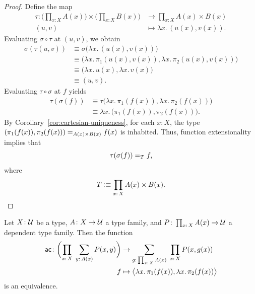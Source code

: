 \begin{proof}
    Define the map
    \begin{align*}
        \tau\colon
            \biggl(
                    \prod_{x\colon X}
                        A(x)\biggr)\times\biggl(\prod_{x\colon X}B(x)
                \biggr)
            &\to\prod_{x\colon X}A(x)\times B(x)\\
            (u,v)&\mapsto
                \lambda x.\,(u(x),v(x)).
    \end{align*}
    Evaluating $\sigma\circ\tau$ at $(u,v)$, we obtain
    \begin{align*}
        \sigma(\tau(u,v))
            &\equiv\sigma\bigl(\lambda x.\,(u(x),v(x))\bigr)\\
            &\equiv
                \bigl(
                    \lambda x.\,\pi_1(u(x),v(x)),
                    \lambda x.\,\pi_2(u(x),v(x))
                \bigr)\\
            &\equiv\bigl(\lambda x.\,u(x),\lambda x.\,v(x)\bigr)\\
            &\equiv(u,v).
    \end{align*}
    Evaluating $\tau\circ\sigma$ at $f$ yields
    \begin{align*}
        \tau(\sigma(f))
            &\equiv\tau
                \bigl(
                    \lambda x.\,\pi_1(f(x)),\lambda x.\,\pi_2(f(x))
                \bigr)\\
            &\equiv\lambda x.\,
                \bigl(\pi_1(f(x)),\pi_2(f(x))\bigr).
    \end{align*}
    By Corollary~\ref{cor:cartesian-uniqueness}, for each $x\colon X$, the type $(\pi_1(f(x)),\pi_2(f(x)))\mathrel{=_{A(x)\times B(x)}}f(x)$ is inhabited. Thus, function extensionality implies that
    \[
        \tau(\sigma(f))\mathrel{=_{T}}f,
    \]
    where
    \[
        T\defeq\prod_{x\colon X}A(x)\times B(x).
    \]
\end{proof}

\begin{thm}\label{thm:ac-generalized}
    Let\/ $X\colon\univ$ be a type, $A\colon X\to\univ$ a type family, and\/ $P\colon\prod_{x\colon X}A(x)\to\univ$ a dependent type family. Then the function
    \begin{align*}
        \fun{ac}\colon
            \biggl(
                \prod_{x\colon X}\;\sum_{y\colon A(x)}P(x,y)
            \biggr)
            &\to
                \sum_{g\colon\prod_{x\colon X}A(x)}\;
                    \prod_{x\colon X}P(x,g(x))\\
        f&\mapsto
            \bigdep{
                \lambda x.\,\pi_1(f(x)),\lambda x.\,\pi_2(f(x))
            }
    \end{align*}
    is an equivalence.
\end{thm}

